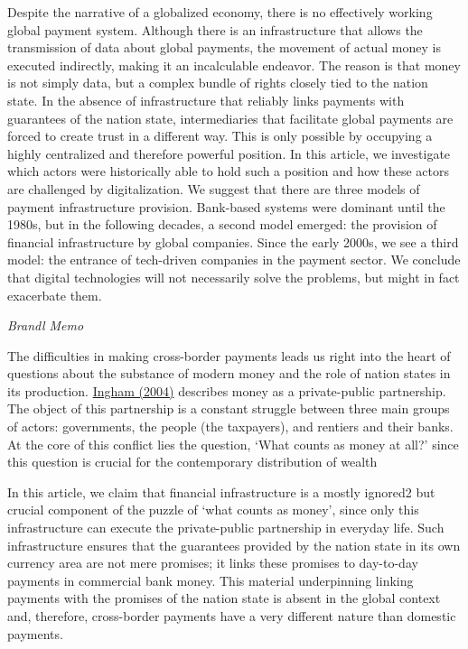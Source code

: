 \documentclass[
]{book}
\begin{document}
Despite the narrative of a globalized economy, there is no effectively working global payment system. Although there is an infrastructure that allows the transmission of data about global payments, the movement of actual money is executed indirectly, making it an incalculable endeavor. The reason is that money is not simply data, but a complex bundle of rights closely tied to the nation state. In the absence of infrastructure that reliably links payments with guarantees of the nation state, intermediaries that facilitate global payments are forced to create trust in a different way. This is only possible by occupying a highly centralized and therefore powerful position. In this article, we investigate which actors were historically able to hold such a position and how these actors are challenged by digitalization. We suggest that there are three models of payment infrastructure provision. Bank-based systems were dominant until the 1980s, but in the following decades, a second model emerged: the provision of financial infrastructure by global companies. Since the early 2000s, we see a third model: the entrance of tech-driven companies in the payment sector. We conclude that digital technologies will not necessarily solve the problems, but might in fact exacerbate them.

\emph{Brandl Memo}

The difficulties in making cross-border payments leads us right into the heart of questions about the substance of modern money and the role of nation states in its production.
\href{https://www.tandfonline.com/doi/full/10.1080/09692290.2021.2016470\#}{Ingham (2004)} describes money as a private-public partnership. The object of this partnership is a constant struggle between three main groups of actors: governments, the people (the taxpayers), and rentiers and their banks. At the core of this conflict lies the question, `What counts as money at all?' since this question is crucial for the contemporary distribution of wealth

In this article, we claim that financial infrastructure is a mostly ignored2 but crucial component of the puzzle of `what counts as money', since only this infrastructure can execute the private-public partnership in everyday life. Such infrastructure ensures that the guarantees provided by the nation state in its own currency area are not mere promises; it links these promises to day-to-day payments in commercial bank money. This material underpinning linking payments with the promises of the nation state is absent in the global context and, therefore, cross-border payments have a very different nature than domestic payments.
\end{document}
